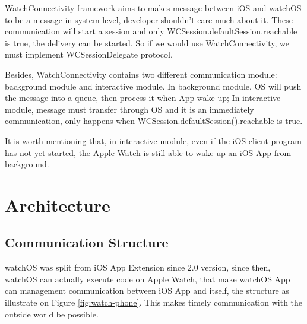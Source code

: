 WatchConnectivity framework aims to makes message between iOS and watchOS to be a message in system level, developer shouldn't care much about it. These communication will start a session and only WCSession.defaultSession.reachable is true, the delivery can be started. So if we would use WatchConnectivity, we must implement WCSessionDelegate protocol.

Besides, WatchConnectivity contains two different communication module: background module and interactive module. In background module, OS will push the message into a queue, then process it when App wake up; In interactive module, message must transfer through OS and it is an immediately communication, only happens when WCSession.defaultSession().reachable is true.

It is worth mentioning that, in interactive module, even if the iOS client program has not yet started, the Apple Watch is still able to wake up an iOS App from background.

\section{Architecture}
\label{sec:arch-design}

\subsection{Communication Structure}
\label{sub:im-arch}

watchOS was split from iOS App Extension since 2.0 version, since then, watchOS can actually execute code on Apple Watch, that make watchOS App can management communication\cite{WatchGuide:2016} between iOS App and itself, the structure as illustrate on Figure \ref{fig:watch-phone}. This makes timely communication with the outside world be possible.

